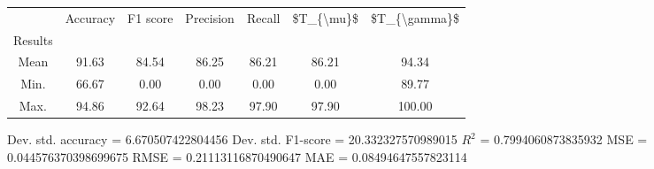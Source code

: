 \begin{tabular}{|c|c|c|c|c|c|c|}
\toprule
{} &  Accuracy &  F1 score &  Precision &  Recall &  \$T\_\{\textbackslash mu\}\$ &  \$T\_\{\textbackslash gamma\}\$ \\
Results &           &           &            &         &            &               \\
\hline
Mean    &     91.63 &     84.54 &      86.25 &   86.21 &      86.21 &         94.34 \\
Min.    &     66.67 &      0.00 &       0.00 &    0.00 &       0.00 &         89.77 \\
Max.    &     94.86 &     92.64 &      98.23 &   97.90 &      97.90 &        100.00 \\
\bottomrule
\end{tabular}

 Dev. std. accuracy = 6.670507422804456
 Dev. std. F1-score = 20.332327570989015
 $R^2$ = 0.7994060873835932
 MSE = 0.044576370398699675
 RMSE = 0.21113116870490647
 MAE = 0.08494647557823114